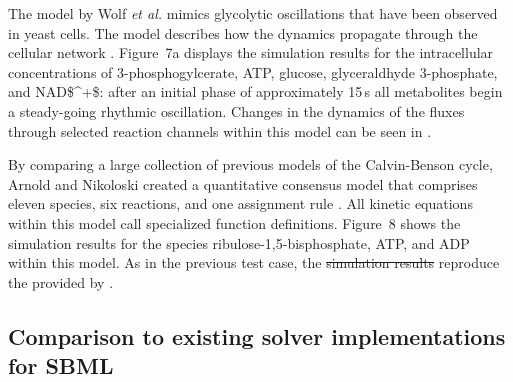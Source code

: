 \documentclass[10pt]{bmc_article}
\newenvironment{bmcformat}{\fussy\setboolean{publ}{true}}{\fussy}
\begin{document}
\begin{bmcformat}
The model by Wolf \emph{et al.} \cite{Wolf2000} mimics glycolytic oscillations
that have been observed in yeast cells.
The model describes how the dynamics propagate through the cellular network
.
Figure~7a displays the simulation results for the intracellular concentrations
of 3-phosphogylcerate, \acs{ATP}, glucose, glyceraldhyde 3-phosphate, and 
\acs{NAD$^+$}:
after an initial phase of approximately 15\,s all metabolites begin a
steady-going rhythmic oscillation.
Changes in the dynamics of the fluxes through selected reaction channels within
this model can be seen in . 

By comparing a large collection of previous models of the Calvin-Benson
cycle, Arnold and Nikoloski created a quantitative consensus model that
comprises eleven species, six reactions, and one assignment rule
\cite{Arnold2011}.
All kinetic equations within this model call specialized function definitions.
Figure~8 shows the simulation results for the species ribulose-1,5-bisphosphate,
\acs{ATP}, and \acs{ADP} within this model.
As in the previous test case, the
\sout{simulation results}
reproduce the  provided by .  

\subsection*{Comparison to existing solver implementations for SBML}


\end{bmcformat}
\end{document}
